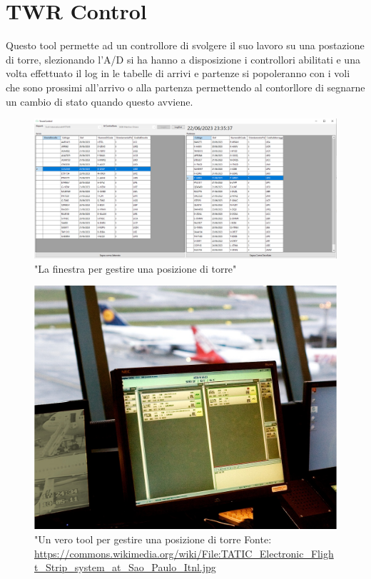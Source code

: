 \section{TWR Control}
Questo tool permette ad un controllore di svolgere il suo lavoro su una postazione di torre,
 slezionando l'A/D si ha hanno a disposizione i controllori abilitati e una volta effettuato il log in le tabelle di arrivi e partenze si popoleranno con i voli che sono prossimi all'arrivo o alla partenza permettendo al contorllore di segnarne un cambio di stato quando questo avviene.
 \begin{figure}[H]
     \centering
     \includegraphics[width=1\textwidth]{figures/twr.PNG}
     \caption{"La finestra per gestire una posizione di torre"}
   \end{figure}
   \begin{figure}[H]
     \centering
     \includegraphics[width=12cm]{figures/TATIC_Electronic_Flight_Strip_system_at_Sao_Paulo_Itnl.jpg}
     \caption{"Un vero tool per gestire una posizione di torre Fonte: \url{https://commons.wikimedia.org/wiki/File:TATIC_Electronic_Flight_Strip_system_at_Sao_Paulo_Itnl.jpg}}
   \end{figure}
